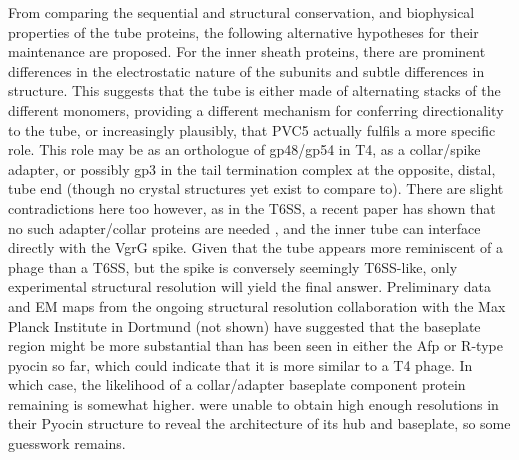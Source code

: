 From comparing the sequential and structural conservation, and biophysical properties of the tube proteins, the following alternative hypotheses for their maintenance are proposed. For the inner sheath proteins, there are prominent differences in the electrostatic nature of the subunits and subtle differences in structure. This suggests that the tube is either made of alternating stacks of the different monomers, providing a different mechanism for conferring directionality to the tube, or increasingly plausibly, that PVC5 actually fulfils a more specific role. This role may be as an orthologue of gp48/gp54 in T4, as a collar/spike adapter, or possibly gp3 in the tail termination complex at the opposite, distal, tube end (though no crystal structures yet exist to compare to). There are slight contradictions here too however, as in the T6SS, a recent paper has shown that no such adapter/collar proteins are needed \citep{Renault2018}, and the inner tube can interface directly with the VgrG spike. Given that the tube appears more reminiscent of a phage than a T6SS, but the spike is conversely seemingly T6SS-like, only experimental structural resolution will yield the final answer. Preliminary data and EM maps from the ongoing structural resolution collaboration with the Max Planck Institute in Dortmund (not shown) have suggested that the baseplate region might be more substantial than has been seen in either the Afp or R-type pyocin so far, which could indicate that it is more similar to a T4 phage. In which case, the likelihood of a collar/adapter baseplate component protein remaining is somewhat higher. \cite{Ge2015} were unable to obtain high enough resolutions in their Pyocin structure to reveal the architecture of its hub and baseplate, so some guesswork remains.

